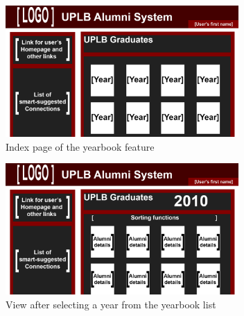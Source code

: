 \documentclass[journal]{./IEEE/IEEEtran}
\begin{document}
\begin{figure}[H]
\begin{center}
\includegraphics[height=50mm]{Images/MockupUI/OnlineYearbook.png}
\caption{Index page of the yearbook feature}
\end{center}
\end{figure}

\begin{figure}[H]
\begin{center}
\includegraphics[height=50mm]{Images/MockupUI/OnlineYearbookYear.png}
\caption{View after selecting a year from the yearbook list}
\end{center}
\end{figure}




\end{document}
